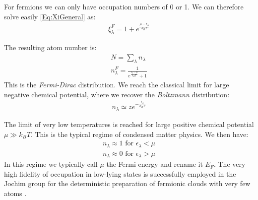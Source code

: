 \documentclass[10pt]{article}
\let\cite\citep
\providecommand\citep{\cite}
\begin{document}
For fermions we can only have occupation numbers of 0 or 1. We can therefore solve easily \eqref{Eq:XiGeneral} as:
\begin{align}
\xi_\lambda^F = 1+e^{\frac{\mu-\epsilon_\lambda}{k_BT}}
\end{align}

The resulting atom number is:
\begin{align}
N = \sum_\lambda n_\lambda\\
n_\lambda^F  = \frac{1}{e^{\frac{\epsilon_\lambda-\mu}{k_BT}}+1}
\end{align}
This is the \textit{Fermi-Dirac} distribution. We reach the classical limit for large negative chemical potential, where we recover the \textit{Boltzmann} distribution:
\begin{align}
n_\lambda  \simeq z e^{-\frac{\epsilon_\lambda}{k_BT}}
\end{align}

The limit of very low temperatures is reached for large positive chemical potential $\mu\gg k_BT$. This is the typical regime of condensed matter physics. We then have:
\begin{align}
n_\lambda \approx 1 \text{ for }\epsilon_\lambda < \mu\\
n_\lambda \approx 0 \text{ for }\epsilon_\lambda > \mu
\end{align}
In this regime we typically call $\mu$ the Fermi energy and rename it $E_F$. The very high fidelity of occupation in low-lying states is successfully employed in the Jochim group for the deterministic preparation of fermionic clouds with very few atoms \cite{Serwane_2011}. 
\end{document}
